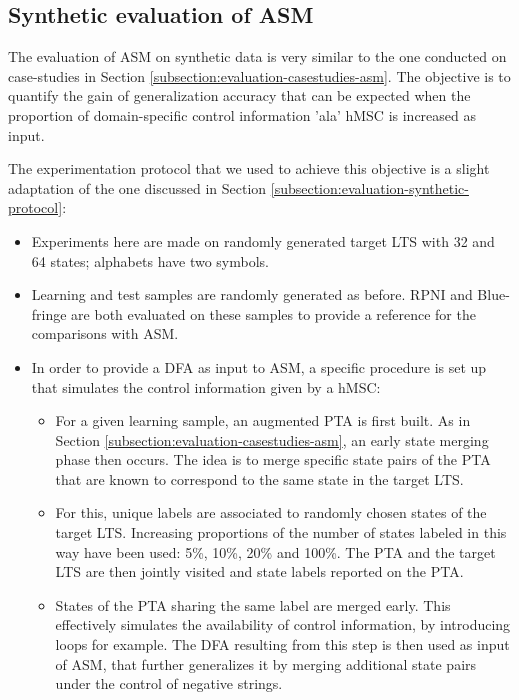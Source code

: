 \subsection{Synthetic evaluation of ASM\label{subsection:evaluation-synthetic-asm}}

The evaluation of ASM on synthetic data is very similar to the one conducted on case-studies in Section \ref{subsection:evaluation-casestudies-asm}. The objective is to quantify the gain of generalization accuracy that can be expected when the proportion of domain-specific control information 'ala' hMSC is increased as input. 

The experimentation protocol that we used to achieve this objective is a slight adaptation of the one discussed in Section \ref{subsection:evaluation-synthetic-protocol}:
\begin{itemize}
\item Experiments here are made on randomly generated target LTS with 32 and 64 states; alphabets have two symbols.
\item Learning and test samples are randomly generated as before. RPNI and Blue-fringe are both evaluated on these samples to provide a reference for the comparisons with ASM.  
\item In order to provide a DFA as input to ASM, a specific procedure is set up that simulates the control information given by a hMSC:
\begin{itemize}
\item For a given learning sample, an augmented PTA is first built. As in Section \ref{subsection:evaluation-casestudies-asm}, an early state merging phase then occurs. The idea is to merge specific state pairs of the PTA that are known to correspond to the same state in the target LTS.
\item For this, unique labels are associated to randomly chosen states of the target LTS. Increasing proportions of the number of states labeled in this way have been used: 5\%, 10\%, 20\% and 100\%. The PTA and the target LTS are then jointly visited and state labels reported on the PTA. 
\item States of the PTA sharing the same label are merged early. This effectively simulates the availability of control information, by introducing loops for example. The DFA resulting from this step is then used as input of ASM, that further generalizes it by merging additional state pairs under the control of negative strings.
\end{itemize}
\end{itemize}
 
